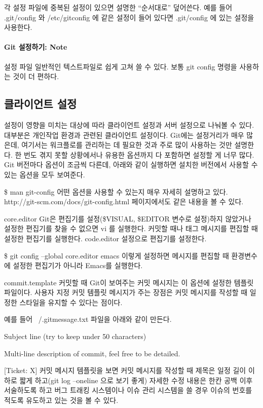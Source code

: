 \documentclass[12pt, a4paper, oneside]{book}
\begin{document}
각 설정 파일에 중복된 설정이 있으면 설명한 “순서대로” 덮어쓴다. 
예를 들어 .git/config 와 /etc/gitconfig 에 같은 설정이 들어 있다면 .git/config 에 있는 설정을 사용한다.

\paragraph{Git 설정하기: Note}
설정 파일 일반적인 텍스트파일로 쉽게 고쳐 쓸 수 있다. 보통 git config 명령을 사용하는 것이 더 편하다.

\subsection{클라이언트 설정}

설정이 영향을 미치는 대상에 따라 클라이언트 설정과 서버 설정으로 나눠볼 수 있다. 대부분은 개인작업 환경과 관련된 클라이언트 설정이다. Git에는 설정거리가 매우 많은데, 여기서는 워크플로를 관리하는 데 필요한 것과 주로 많이 사용하는 것만 설명한다. 한 번도 겪지 못할 상황에서나 유용한 옵션까지 다 포함하면 설정할 게 너무 많다. Git 버전마다 옵션이 조금씩 다른데, 아래와 같이 실행하면 설치한 버전에서 사용할 수 있는 옵션을 모두 보여준다.

\$ man git-config
어떤 옵션을 사용할 수 있는지 매우 자세히 설명하고 있다. http://git-scm.com/docs/git-config.html 페이지에서도 같은 내용을 볼 수 있다.

core.editor
Git은 편집기를 설정(\$VISUAL, \$EDITOR 변수로 설정)하지 않았거나 설정한 편집기를 찾을 수 없으면 vi 를 실행한다. 커밋할 때나 태그 메시지를 편집할 때 설정한 편집기를 실행한다. code.editor 설정으로 편집기를 설정한다.

\$ git config --global core.editor emacs
이렇게 설정하면 메시지를 편집할 때 환경변수에 설정한 편집기가 아니라 Emacs를 실행한다.

commit.template
커밋할 때 Git이 보여주는 커밋 메시지는 이 옵션에 설정한 템플릿 파일이다. 사용자 지정 커밋 템플릿 메시지가 주는 장점은 커밋 메시지를 작성할 때 일정한 스타일을 유지할 수 있다는 점이다.

예를 들어 ~/.gitmessage.txt 파일을 아래와 같이 만든다.

Subject line (try to keep under 50 characters)

Multi-line description of commit,
feel free to be detailed.

[Ticket: X]
커밋 메시지 템플릿을 보면 커밋 메시지를 작성할 때 제목은 일정 길이 이하로 짧게 하고(git log --oneline 으로 보기 좋게) 자세한 수정 내용은 한칸 공백 이후 서술하도록 하고 버그 트래킹 시스템이나 이슈 관리 시스템을 쓸 경우 이슈의 번호를 적도록 유도하고 있는 것을 볼 수 있다.
\end{document}
